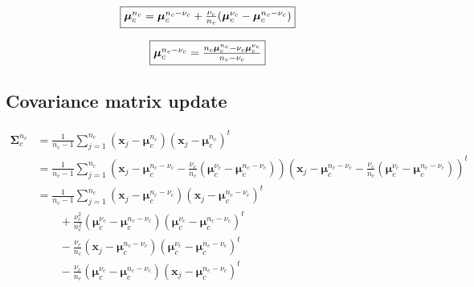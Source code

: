 \documentclass[a4paper,11pt,DIV=16,abstracton]{scrartcl}
\begin{document}
        \begin{equation}
             \fbox{$\boldsymbol{\mu}_c^{n_c} = \boldsymbol{\mu}_c^{n_c-\nu_c} + \frac{\nu_c}{n_c} (\boldsymbol{\mu}_c^{\nu_c} - \boldsymbol{\mu}_c^{n_c-\nu_c})$}
        \end{equation}

        \begin{equation}
            \fbox{$\boldsymbol{\mu}_c^{n_c-\nu_c} = \frac{n_c \boldsymbol{\mu}_c^{n_c} - \nu_c \boldsymbol{\mu}_c^{\nu_c}}{n_c - \nu_c}$}
        \end{equation}

    \subsection{Covariance matrix update}
        \begin{align*}
            \boldsymbol{\Sigma}_c^{n_c} &= \frac{1}{n_c - 1} \sum_{j = 1}^{n_c} (\mathbf{x}_j - \boldsymbol{\mu}_c^{n_c}) (\mathbf{x}_j - \boldsymbol{\mu}_c^{n_c})^t \\
                           &= \frac{1}{n_c - 1} \sum_{j = 1}^{n_c} (\mathbf{x}_j - \boldsymbol{\mu}_c^{n_c-\nu_c} - \frac{\nu_c}{n_c} (\boldsymbol{\mu}_c^{\nu_c} - \boldsymbol{\mu}_c^{n_c-\nu_c})) (\mathbf{x}_j - \boldsymbol{\mu}_c^{n_c-\nu_c} - \frac{\nu_c}{n_c} (\boldsymbol{\mu}_c^{\nu_c} - \boldsymbol{\mu}_c^{n_c-\nu_c}))^t \\
                           &= \frac{1}{n_c - 1} \sum_{j = 1}^{n_c} (\mathbf{x}_j - \boldsymbol{\mu}_c^{n_c-\nu_c}) (\mathbf{x}_j - \boldsymbol{\mu}_c^{n_c-\nu_c})^t \\
                                                                 &\qquad + \frac{\nu_c^2}{n_c^2} (\boldsymbol{\mu}_c^{\nu_c}-\boldsymbol{\mu}_c^{n_c-\nu_c})(\boldsymbol{\mu}_c^{\nu_c}-\boldsymbol{\mu}_c^{n_c-\nu_c})^t \\
                                                                 &\qquad - \frac{\nu_c}{n_c} (\mathbf{x}_j-\boldsymbol{\mu}_c^{n_c-\nu_c})(\boldsymbol{\mu}_c^{\nu_c}-\boldsymbol{\mu}_c^{n_c-\nu_c})^t \\
                                                                 &\qquad - \frac{\nu_c}{n_c} (\boldsymbol{\mu}_c^{\nu_c}-\boldsymbol{\mu}_c^{n_c-\nu_c})(\mathbf{x}_j-\boldsymbol{\mu}_c^{n_c-\nu_c})^t
        \end{align*}
\end{document}
